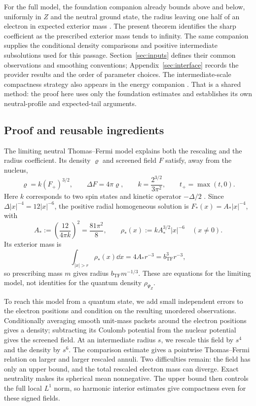 For the full model, the foundation companion already bounds above and
below, uniformly in $Z$ and the neutral ground state, the radius leaving
one half of an electron in expected exterior mass
\cite[Theorem~1.2]{OuterRadius}.  The present theorem identifies the
sharp coefficient as the prescribed exterior mass tends to infinity.
The same companion supplies the conditional density comparisons and
positive intermediate subsolutions used for this passage.
Section~\ref{sec:inputs} defines their common observations
and smoothing conventions; Appendix~\ref{sec:interface} records the
provider results and the order of parameter choices.
The intermediate-scale compactness strategy also appears in the
energy companion \cite[\EnergyProfile]{EnergyPart}.
That is a shared method: the proof here uses only the foundation
estimates and establishes its own neutral-profile and expected-tail
arguments.

\subsection{Proof and reusable ingredients}

The limiting neutral Thomas--Fermi model explains both the rescaling and
the radius coefficient.  Its density $\varrho$ and screened field $F$
satisfy, away from the nucleus,
\begin{equation}\label{intro:constants}
 \varrho=k(F_+)^{3/2},\qquad \Delta F=4\pi\varrho,
 \qquad k=\frac{2^{3/2}}{3\pi^2},\qquad t_+=\max(t,0).
\end{equation}
Here $k$ corresponds to two spin states and kinetic operator $-\Delta/2$
\cite[\FoundationConstants]{OuterRadius}.  Since
$\Delta|x|^{-4}=12|x|^{-6}$, the positive radial homogeneous solution is
$F_*(x)=A_*|x|^{-4}$, with
\begin{equation}\label{intro:sommerfeld}
 A_*:=\left(\frac{12}{4\pi k}\right)^2=\frac{81\pi^2}{8},
 \qquad \rho_*(x):=kA_*^{3/2}|x|^{-6}\quad(x\ne0).
\end{equation}
Its exterior mass is
\[
 \int_{|x|>r}\rho_*(x)\dd x=4A_*r^{-3}
       =b_{\mathrm{TF}}^3r^{-3},
\]
so prescribing mass $m$ gives radius $b_{\mathrm{TF}}m^{-1/3}$.
These are equations for the limiting model, not identities for the
quantum density $\rho_{\Psi_Z}$.

To reach this model from a quantum state, we add small independent errors
to the electron positions and condition on the resulting unordered
observations.  Conditionally averaging smooth unit-mass packets around
the electron positions gives a density; subtracting its Coulomb potential
from the nuclear potential gives the screened field.  At an intermediate
radius $s$, we rescale this field by $s^4$ and the density by $s^6$.
The comparison estimate gives a pointwise Thomas--Fermi relation on
larger and larger rescaled annuli.  Two difficulties remain: the field
has only an upper bound, and the total rescaled electron mass can diverge.
Exact neutrality makes its spherical mean nonnegative.  The upper bound
then controls the full local $L^1$ norm, so harmonic interior estimates
give compactness even for these signed fields.

